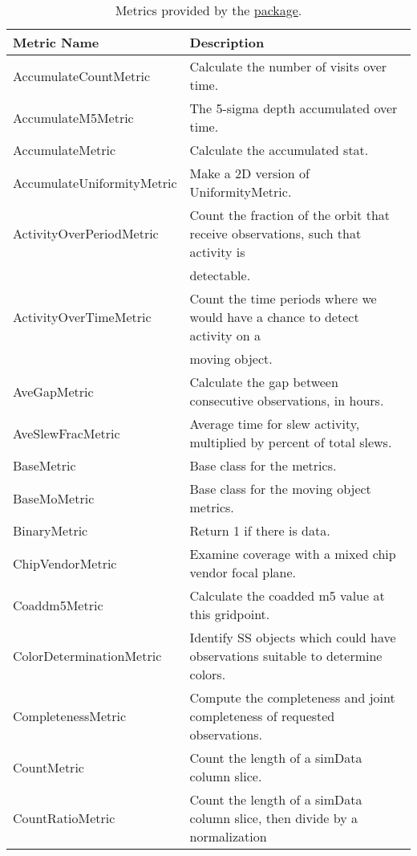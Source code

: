 \begin{table}[!h]
\scriptsize
\setcounter{table}{0}
\makeatletter
\renewcommand{\thetable}{A.\arabic{table}}
\caption{Metrics provided by the
\href{https://github.com/lsst/sims_maf/tree/master/python/lsst/sims/maf}{\MAF package}.
\label{tab:maf_metrics}}
\medskip
\begin{tabular}{ll}
\hline
                Metric Name &                                                                       Description \\
\hline\hline
 AccumulateCountMetric &  Calculate the number of visits over time. \\
 AccumulateM5Metric &  The 5-sigma depth accumulated over time. \\
 AccumulateMetric &  Calculate the accumulated stat. \\
 AccumulateUniformityMetric &  Make a 2D version of UniformityMetric. \\
 ActivityOverPeriodMetric &  Count the fraction of the orbit that receive observations, such that activity is \\
  &  detectable. \\
 ActivityOverTimeMetric &  Count the time periods where we would have a chance to detect activity on a \\
  &  moving object. \\
 AveGapMetric &  Calculate the gap between consecutive observations, in hours. \\
 AveSlewFracMetric &  Average time for slew activity, multiplied by percent of total slews. \\
 BaseMetric &  Base class for the metrics. \\
 BaseMoMetric &  Base class for the moving object metrics. \\
 BinaryMetric &  Return 1 if there is data. \\
 ChipVendorMetric &  Examine coverage with a mixed chip vendor focal plane. \\
 Coaddm5Metric &  Calculate the coadded m5 value at this gridpoint. \\
 ColorDeterminationMetric &  Identify SS objects which could have observations suitable to determine colors. \\
 CompletenessMetric &  Compute the completeness and joint completeness of requested observations. \\
 CountMetric &  Count the length of a simData column slice. \\
 CountRatioMetric &  Count the length of a simData column slice, then divide by a normalization \\

\end{tabular}
\end{table}
